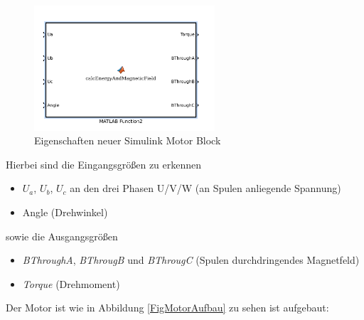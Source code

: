 \begin{figure}[htbp]
	\centering
	\includegraphics[width=0.6\textwidth]{./sim/pictures/matlabBox.png}
	\caption{Eigenschaften neuer Simulink Motor Block}
	\label{FigMotorBlock}
\end{figure}
Hierbei sind die Eingangsgrößen zu erkennen
\begin{itemize}
	\item $U_a$, $U_b$, $U_c$ an den drei Phasen U/V/W (an Spulen anliegende Spannung)
	\item Angle (Drehwinkel)
\end{itemize}
sowie die Ausgangsgrößen
\begin{itemize}
	\item \textit{BThroughA}, \textit{BThrougB} und \textit{BThrougC} (Spulen durchdringendes Magnetfeld)
	\item \textit{Torque} (Drehmoment)
\end{itemize}

\vspace{1cm}
Der Motor ist wie in Abbildung \ref{FigMotorAufbau} zu sehen ist aufgebaut:

